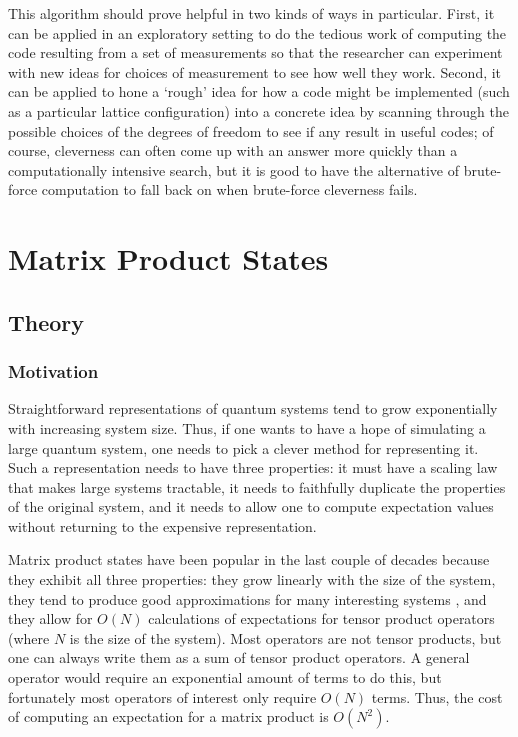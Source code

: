 \documentclass[12pt]{amsbook}
\theoremstyle{plain}
\theoremstyle{definition}
\theoremstyle{remark}
\begin{document}
This algorithm should prove helpful in two kinds of ways in particular.  First, it can be applied in an exploratory setting to do the tedious work of computing the code resulting from a set of measurements so that the researcher can experiment with new ideas for choices of measurement to see how well they work.  Second, it can be applied to hone a `rough' idea for how a code might be implemented (such as a particular lattice configuration) into a concrete idea by scanning through the possible choices of the degrees of freedom to see if any result in useful codes; of course, cleverness can often come up with an answer more quickly than a computationally intensive search, but it is good to have the alternative of brute-force computation to fall back on when brute-force cleverness fails.
\part{Matrix Product States}
\label{part:Matrix Product States}
\chapter{Theory}
\label{sec:MPSTheory}
\section{Motivation}

Straightforward representations of quantum systems tend to grow exponentially with increasing system size.  Thus, if one wants to have a hope of simulating a large quantum system, one needs to pick a clever method for representing it.  Such a representation needs to have three properties:  it must have a scaling law that makes large systems tractable, it needs to faithfully duplicate the properties of the original system, and it needs to allow one to compute expectation values without returning to the expensive representation.

Matrix product states \cite{Rommer:1997gf} \cite{Perotti:2005bh} \cite{cond-mat/0404706} \cite{cond-mat/0505140} \cite{Schollwock:2005ul} have been popular in the last couple of decades because they exhibit all three properties:  they grow linearly with the size of the system, they tend to produce good approximations for many interesting systems \cite{cond-mat/0505140}, and they allow for $O(N)$ calculations of expectations for tensor product operators (where $N$ is the size of the system).  Most operators are not tensor products, but one can always write them as a sum of tensor product operators.  A general operator would require an exponential amount of terms to do this, but fortunately most operators of interest only require $O(N)$ terms.  Thus, the cost of computing an expectation for a matrix product is $O(N^2)$.
\end{document}
